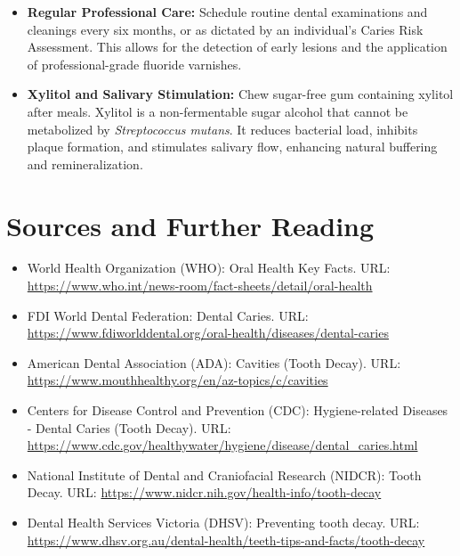 \begin{itemize}
    \item \textbf{Regular Professional Care:} Schedule routine dental examinations and cleanings every six months, or as dictated by an individual's Caries Risk Assessment. This allows for the detection of early lesions and the application of professional-grade fluoride varnishes.
    \item \textbf{Xylitol and Salivary Stimulation:} Chew sugar-free gum containing xylitol after meals. Xylitol is a non-fermentable sugar alcohol that cannot be metabolized by \textit{Streptococcus mutans}. It reduces bacterial load, inhibits plaque formation, and stimulates salivary flow, enhancing natural buffering and remineralization.
\end{itemize}

\section*{Sources and Further Reading}
\begin{itemize}
    \item World Health Organization (WHO): Oral Health Key Facts. URL: \href{https://www.who.int/news-room/fact-sheets/detail/oral-health}{https://www.who.int/news-room/fact-sheets/detail/oral-health}
    \item FDI World Dental Federation: Dental Caries. URL: \href{https://www.fdiworlddental.org/oral-health/diseases/dental-caries}{https://www.fdiworlddental.org/oral-health/diseases/dental-caries}
    \item American Dental Association (ADA): Cavities (Tooth Decay). URL: \href{https://www.mouthhealthy.org/en/az-topics/c/cavities}{https://www.mouthhealthy.org/en/az-topics/c/cavities}
    \item Centers for Disease Control and Prevention (CDC): Hygiene-related Diseases - Dental Caries (Tooth Decay). URL: \href{https://www.cdc.gov/healthywater/hygiene/disease/dental\_caries.html}{https://www.cdc.gov/healthywater/hygiene/disease/dental\_caries.html}
    \item National Institute of Dental and Craniofacial Research (NIDCR): Tooth Decay. URL: \href{https://www.nidcr.nih.gov/health-info/tooth-decay}{https://www.nidcr.nih.gov/health-info/tooth-decay}
    \item Dental Health Services Victoria (DHSV): Preventing tooth decay. URL: \href{https://www.dhsv.org.au/dental-health/teeth-tips-and-facts/tooth-decay}{https://www.dhsv.org.au/dental-health/teeth-tips-and-facts/tooth-decay}
\end{itemize}
